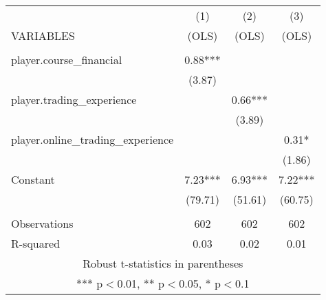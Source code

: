 \documentclass[]{article}
\begin{document}
\begin{tabular}{lccc} \hline
 & (1) & (2) & (3) \\
VARIABLES & (OLS) & (OLS) & (OLS) \\ \hline
 &  &  &  \\
player.course\_financial & 0.88*** &  &  \\
 & (3.87) &  &  \\
player.trading\_experience &  & 0.66*** &  \\
 &  & (3.89) &  \\
player.online\_trading\_experience &  &  & 0.31* \\
 &  &  & (1.86) \\
Constant & 7.23*** & 6.93*** & 7.22*** \\
 & (79.71) & (51.61) & (60.75) \\
 &  &  &  \\
Observations & 602 & 602 & 602 \\
 R-squared & 0.03 & 0.02 & 0.01 \\ \hline
\multicolumn{4}{c}{ Robust t-statistics in parentheses} \\
\multicolumn{4}{c}{ *** p$<$0.01, ** p$<$0.05, * p$<$0.1} \\
\end{tabular}
\end{document}
